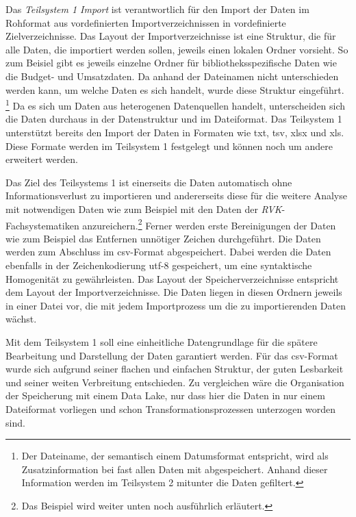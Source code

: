     Das \textit{Teilsystem 1 Import} ist verantwortlich für den Import der Daten im Rohformat aus vordefinierten Importverzeichnissen 
    in vordefinierte Zielverzeichnisse. Das Layout der Importverzeichnisse ist eine Struktur, die für alle Daten, die importiert werden sollen,
    jeweils einen lokalen Ordner vorsieht. So zum Beisiel gibt es jeweils einzelne Ordner für bibliotheksspezifische Daten wie die Budget- und Umsatzdaten.
    Da anhand der Dateinamen nicht unterschieden werden kann, um welche Daten es sich handelt, wurde diese Struktur eingeführt. 
    \footnote{Der Dateiname, der semantisch einem Datumsformat entspricht, wird als Zusatzinformation bei fast allen Daten mit abgespeichert.
    Anhand dieser Information werden im Teilsystem 2 mitunter die Daten gefiltert.} 
    Da es sich um Daten aus heterogenen Datenquellen handelt, unterscheiden sich die Daten durchaus in der Datenstruktur und im Dateiformat. 
    Das Teilsystem 1 unterstützt bereits den Import der Daten in Formaten wie txt, tsv, xlsx und xls. Diese Formate werden im Teilsystem 1 festgelegt
    und können noch um andere erweitert werden.
    
    Das Ziel des Teilsystems 1 ist einerseits die Daten automatisch ohne Informationsverlust zu importieren 
    und andererseits diese für die weitere Analyse mit notwendigen Daten wie zum Beispiel mit den Daten 
    der \textit{\acrshort{RVK}}-Fachsystematiken anzureichern.\footnote{Das Beispiel wird weiter unten noch ausführlich erläutert.}
    Ferner werden erste Bereinigungen der Daten wie zum Beispiel das Entfernen unnötiger Zeichen durchgeführt. Die Daten werden zum Abschluss im csv-Format abgespeichert. 
    Dabei werden die Daten ebenfalls in der Zeichenkodierung utf-8 gespeichert, um eine syntaktische Homogenität zu gewährleisten. Das Layout der Speicherverzeichnisse
    entspricht dem Layout der Importverzeichnisse. Die Daten liegen in diesen Ordnern jeweils in einer Datei vor, die mit jedem Importprozess um die zu importierenden Daten wächst.

    Mit dem Teilsystem 1 soll eine einheitliche Datengrundlage für die spätere Bearbeitung und Darstellung der Daten garantiert werden. Für das csv-Format wurde sich aufgrund seiner flachen und einfachen Struktur, der guten Lesbarkeit
    und seiner weiten Verbreitung entschieden. Zu vergleichen wäre die Organisation der Speicherung mit einem Data Lake, nur dass hier die Daten in nur einem Dateiformat vorliegen und schon Transformationsprozessen unterzogen worden sind.
    
